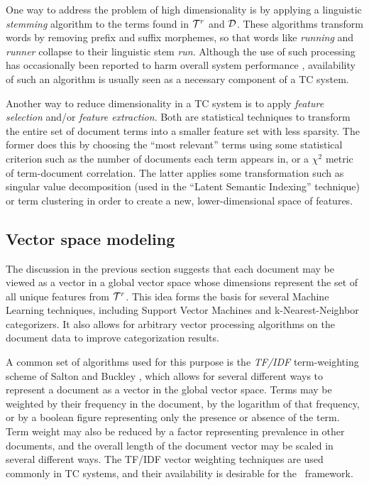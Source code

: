 One way to address the problem of high dimensionality is by applying a
linguistic \emph{stemming} algorithm to the terms found in $\mathcal{T}^r$
and $\mathcal{D}$.  These algorithms transform words by removing prefix and
suffix morphemes, so that words like \emph{running} and \emph{runner}
collapse to their linguistic stem \emph{run}.  Although the use of
such processing has occasionally been reported to harm overall system
performance \cite{baker:98}, availability of such an algorithm is
usually seen as a necessary component of a TC
system.\cite[p. 12]{sebastiani:02}

Another way to reduce dimensionality in a TC system is to apply
\emph{feature selection} and/or \emph{feature extraction}.  Both are
statistical techniques to transform the entire set of document terms
into a smaller feature set with less sparsity.  The former does this
by choosing the ``most relevant'' terms using some statistical
criterion such as the number of documents each term appears in, or a
$\chi^2$ metric of term-document correlation.\cite{yang:97} The latter
applies some transformation such as singular value decomposition (used
in the ``Latent Semantic Indexing'' technique) or term clustering in
order to create a new, lower-dimensional space of features.

\subsection{Vector space modeling}

The discussion in the previous section suggests that each document may
be viewed as a vector in a global vector space whose dimensions
represent the set of all unique features from $\mathcal{T}^r$.  This idea
forms the basis for several Machine Learning techniques, including
Support Vector Machines and k-Nearest-Neighbor categorizers.  It also
allows for arbitrary vector processing algorithms on the document data
to improve categorization results.

A common set of algorithms used for this purpose is the \emph{TF/IDF}
term-weighting scheme of Salton and Buckley \cite{salton:88}, which
allows for several different ways to represent a document as a vector
in the global vector space.  Terms may be weighted by their frequency
in the document, by the logarithm of that frequency, or by a boolean
figure representing only the presence or absence of the term.  Term
weight may also be reduced by a factor representing prevalence in
other documents, and the overall length of the document vector may be
scaled in several different ways.  The TF/IDF vector weighting
techniques are used commonly in TC systems, and their availability is
desirable for the \aicat\ framework.

